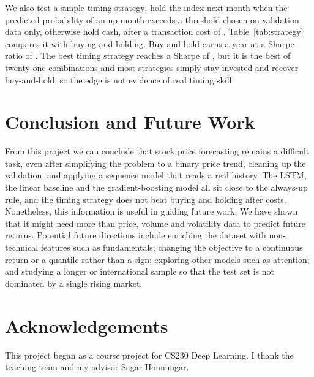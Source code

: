 \documentclass[10pt]{article}
\begin{document}
We also test a simple timing strategy: hold the index next month when the predicted
probability of an up month exceeds a threshold chosen on validation data only,
otherwise hold cash, after a transaction cost of \cost{}.
Table~\ref{tab:strategy} compares it with buying and holding. Buy-and-hold earns
\bhReturn{} a year at a Sharpe ratio of \bhSharpe{}. The best timing strategy
reaches a Sharpe of \bestSharpe{}, but it is the best of twenty-one combinations
and most strategies simply stay invested and recover buy-and-hold, so the edge is
not evidence of real timing skill.

\begin{table}[t]
  \centering
  \small
  \caption{Annualised test performance, buy-and-hold against the best timing
  strategy per model family, after costs.}
  \label{tab:strategy}
  
\end{table}

\section{Conclusion and Future Work}

From this project we can conclude that stock price forecasting remains a difficult
task, even after simplifying the problem to a binary price trend, cleaning up the
validation, and applying a sequence model that reads a real history. The LSTM, the
linear baseline and the gradient-boosting model all sit close to the always-up
rule, and the timing strategy does not beat buying and holding after costs.
Nonetheless, this information is useful in guiding future work. We have shown that
it might need more than price, volume and volatility data to predict future
returns. Potential future directions include enriching the dataset with
non-technical features such as fundamentals; changing the objective to a continuous
return or a quantile rather than a sign; exploring other models such as attention;
and studying a longer or international sample so that the test set is not dominated
by a single rising market.

\section*{Acknowledgements}

This project began as a course project for CS230 Deep Learning. I thank the
teaching team and my advisor Sagar Honnungar.
\end{document}

